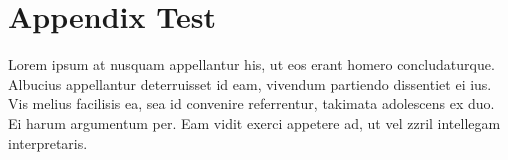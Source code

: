 
\chapter{Appendix Test}
Lorem ipsum at nusquam appellantur his, ut eos erant homero
concludaturque. Albucius appellantur deterruisset id eam, vivendum
partiendo dissentiet ei ius. Vis melius facilisis ea, sea id convenire
referrentur, takimata adolescens ex duo. Ei harum argumentum per. Eam
vidit exerci appetere ad, ut vel zzril intellegam interpretaris.

\begin{comment}
Entonces, es importante recordar algunas propiedades de una cadena de Márkov, que ennumera Jordan (paper 2007) y que se pueden deducir usando el teorema de separación-d.
\begin{align}
\begin{split}
  p(\mb{X} \,|\, z_n) =~ &p(x_1, ..., x_n \,|\, z_n) 
  \\ &p(x_{n+1}, ..., x_N \,|\, z_n)
\end{split} \label{eqn:3-10} \\
p(x_1, ..., x_{n-1} \,|\, x_n, z_n) =~ 
  &p(x_1, ..., x_{n-1} \,|\, z_n) 
\label{eqn:3-11} \\
p(x_1, ..., x_{n-1} \,|\, z_{n-1}, z_n) =~ 
  &p(x_1, ..., x_{n-1} \,|\, z_{n-1}) 
\label{eqn:3-12} \\
p(x_{n+1}, ..., x_N \,|\, z_n, z_{n+1}) =~ 
  &p(x_{n+1}, ..., x_N \,|\, z_{n+1}) 
\label{eqn:3-13} \\
p(x_{n+2}, ..., x_N \,|\, z_{n+1}, x_{n+1}) =~ 
  &p(x_{n+2}, ..., x_N \,|\, z_{n+1}11 
\label{eqn:3-14} \\ 
\begin{split}
  p(\mb{X} \,|\, z_{n-1}, z_n) =~ &p(x_1, ..., x_{n-1} \,|\, z_{n-1}) 
  \\ &p(x_n \,|\, z_n) 
  \\ &p(x_{n+1}, ..., x_N | z_n)
\end{split} \label{eqn:3-15} \\
  p(x_{N+1} \,|\, \mb{X} ,z_{N+1}) =~ &p(x_{N+1} \,|\, z_{N+1}) 
\label{eqn:3-16} \\
p(z_{N+1} \,|\, z_N, \mb{X}) =~ &p(z_{N+1} \,|\, z_N) 
\label{eqn:3-17} \\
\end{align}
donde $\mb{X} = \lbrce x_1, ..., x_N \rbrace$. 
\end{comment}

